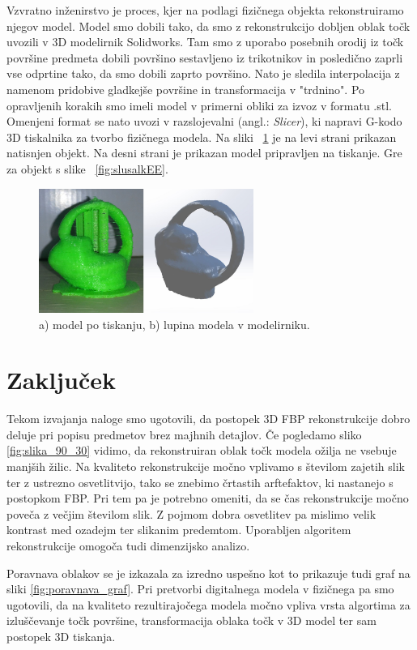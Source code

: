\documentclass[journal,a4paper,twoside]{sty/IEEEtran}
\begin{document}
Vzvratno inženirstvo je proces, kjer na podlagi fizičnega objekta rekonstruiramo njegov model. Model smo dobili tako, da smo z rekonstrukcijo dobljen oblak točk uvozili v 3D modelirnik Solidworks. Tam smo z uporabo posebnih orodij iz točk površine predmeta dobili površino sestavljeno iz trikotnikov in posledično zaprli vse odprtine tako, da smo dobili zaprto površino. Nato je sledila interpolacija z namenom pridobive gladkejše površine in transformacija v "trdnino". Po opravljenih korakih smo imeli model v primerni obliki za izvoz v formatu .stl. Omenjeni format se nato uvozi v razslojevalni (angl.: \textit{Slicer}), ki napravi G-kodo 3D tiskalnika za tvorbo fizičnega modela. Na sliki ~\ref{fig:print_slusalke} je na levi strani prikazan natisnjen objekt. Na desni strani je prikazan model pripravljen na tiskanje. Gre za objekt s slike ~\ref{fig:slusalkEE}.

\begin{figure}[H]
	\centerline{\includegraphics[width=7cm]{fig/print_slusalke}}
	\caption{a) model po tiskanju, b) lupina modela v modelirniku.}
	\label{fig:print_slusalke}
\end{figure}


\section{Zaključek}
Tekom izvajanja naloge smo ugotovili, da postopek 3D FBP rekonstrukcije dobro deluje pri popisu predmetov brez majhnih detajlov. Če pogledamo sliko \ref{fig:slika_90_30} vidimo, da rekonstruiran oblak točk modela ožilja ne vsebuje manjših žilic. Na kvaliteto rekonstrukcije močno vplivamo s številom zajetih slik ter z ustrezno osvetlitvijo, tako se znebimo črtastih arftefaktov, ki nastanejo s postopkom FBP. Pri tem pa je potrebno omeniti, da se čas rekonstrukcije močno poveča z večjim številom slik. Z pojmom dobra osvetlitev pa mislimo velik kontrast med ozadejm ter slikanim predemtom. Uporabljen algoritem rekonstrukcije omogoča tudi dimenzijsko analizo.

Poravnava oblakov se je izkazala za izredno uspešno kot to prikazuje tudi graf na sliki \ref{fig:poravnava_graf}. Pri pretvorbi digitalnega modela v fizičnega pa smo ugotovili, da na kvaliteto rezultirajočega modela močno vpliva vrsta algortima za izluščevanje točk površine, transformacija oblaka točk v 3D model ter sam postopek 3D tiskanja.
\end{document}
